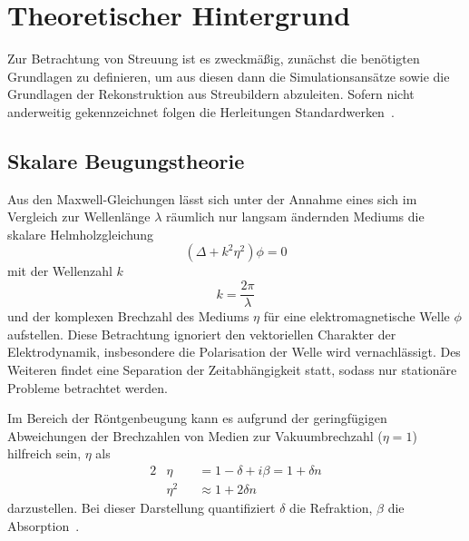 \chapter{Theoretischer Hintergrund}
\label{chap:theorie}
Zur Betrachtung von Streuung ist es zweckmäßig, zunächst die benötigten Grundlagen zu definieren, um aus diesen dann die Simulationsansätze sowie die Grundlagen der Rekonstruktion aus Streubildern abzuleiten. Sofern nicht anderweitig gekennzeichnet folgen die Herleitungen Standardwerken~\cite{goodman2005,cowley1995,born1980}.
\section{Skalare Beugungstheorie}
Aus den Maxwell-Gleichungen lässt sich unter der Annahme eines sich im Vergleich zur Wellenlänge $\lambda$ räumlich nur langsam ändernden Mediums die skalare Helmholzgleichung
\begin{equation}
	\label{eq:wellengleichung_r}
	(\Delta+k^2\eta^2)\phi=0
\end{equation}
mit der Wellenzahl $k$
\begin{equation}
	k=\frac{2\pi}{\lambda}
\end{equation} und der komplexen Brechzahl des Mediums $\eta$ für eine elektromagnetische Welle $\phi$ aufstellen. Diese Betrachtung ignoriert den vektoriellen Charakter der Elektrodynamik, insbesondere die Polarisation der Welle wird vernachlässigt. Des Weiteren findet eine Separation der Zeitabhängigkeit statt, sodass nur stationäre Probleme betrachtet werden.

Im Bereich der Röntgenbeugung kann es aufgrund der geringfügigen Abweichungen der Brechzahlen von Medien zur Vakuumbrechzahl ($\eta=1$) hilfreich sein, $\eta$ als
\begin{alignat}{2}
	\label{eq:brechzahl}
	  & \eta   &   & =1-\delta+i\beta=1 + \delta n \\
	\label{eq:approxbrechzahl}
	  & \eta^2 &   & \approx 1 + 2\delta n         
\end{alignat}
darzustellen. Bei dieser Darstellung quantifiziert $\delta$ die Refraktion, $\beta$ die Absorption~\cite{attwood1999}.

